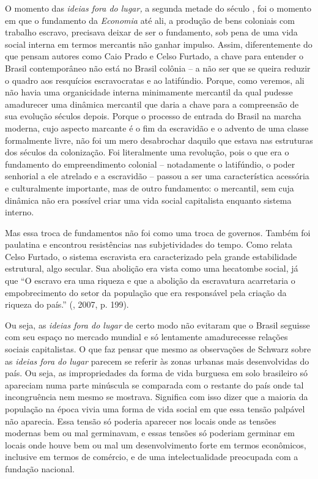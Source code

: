 O momento das \emph{ideias fora do lugar,} a segunda metade do século
, foi o momento em que o fundamento da \emph{Economia} até ali, a
produção de bens coloniais com trabalho escravo, precisava deixar de ser
o fundamento, sob pena de uma vida social interna em termos mercantis
não ganhar impulso. Assim, diferentemente do que pensam autores como
Caio Prado e Celso Furtado, a chave para entender o Brasil contemporâneo
não está no Brasil colônia -- a não ser que se queira reduzir o quadro
aos resquícios escravocratas e ao latifúndio. Porque, como veremos, ali
não havia uma organicidade interna minimamente mercantil da qual pudesse
amadurecer uma dinâmica mercantil que daria a chave para a compreensão
de sua evolução séculos depois. Porque o processo de entrada do Brasil
na marcha moderna, cujo aspecto marcante é o fim da escravidão e o
advento de uma classe formalmente livre, não foi um mero desabrochar
daquilo que estava nas estruturas dos séculos da colonização. Foi
literalmente uma revolução, pois o que era o fundamento do
empreendimento colonial -- notadamente o latifúndio, o poder senhorial a
ele atrelado e a escravidão -- passou a ser uma característica acessória
e culturalmente importante, mas de outro fundamento: o mercantil, sem
cuja dinâmica não era possível criar uma vida social capitalista
enquanto sistema interno.

Mas essa troca de fundamentos não foi como uma troca de governos. Também
foi paulatina e encontrou resistências nas subjetividades do tempo. Como
relata Celso Furtado, o sistema escravista era caracterizado pela grande
estabilidade estrutural, algo secular. Sua abolição era vista como uma
hecatombe social, já que ``O escravo era uma riqueza e que a abolição da
escravatura acarretaria o empobrecimento do setor da população que era
responsável pela criação da riqueza do país.'' (, 2007, p. 199).

Ou seja, as \emph{ideias fora do lugar} de certo modo não evitaram que o
Brasil seguisse com seu espaço no mercado mundial e só lentamente
amadurecesse relações sociais capitalistas. O que faz pensar que mesmo
as observações de Schwarz sobre as \emph{ideias fora do lugar} parecem
se referir às zonas urbanas mais desenvolvidas do país. Ou seja, as
impropriedades da forma de vida burguesa em solo brasileiro só apareciam
numa parte minúscula se comparada com o restante do país onde tal
incongruência nem mesmo se mostrava. Significa com isso dizer que a
maioria da população na época vivia uma forma de vida social em que essa
tensão palpável não aparecia. Essa tensão só poderia aparecer nos locais
onde as tensões modernas bem ou mal germinavam, e essas tensões só
poderiam germinar em locais onde houve bem ou mal um desenvolvimento
forte em termos econômicos, inclusive em termos de comércio, e de uma
intelectualidade preocupada com a fundação nacional.

